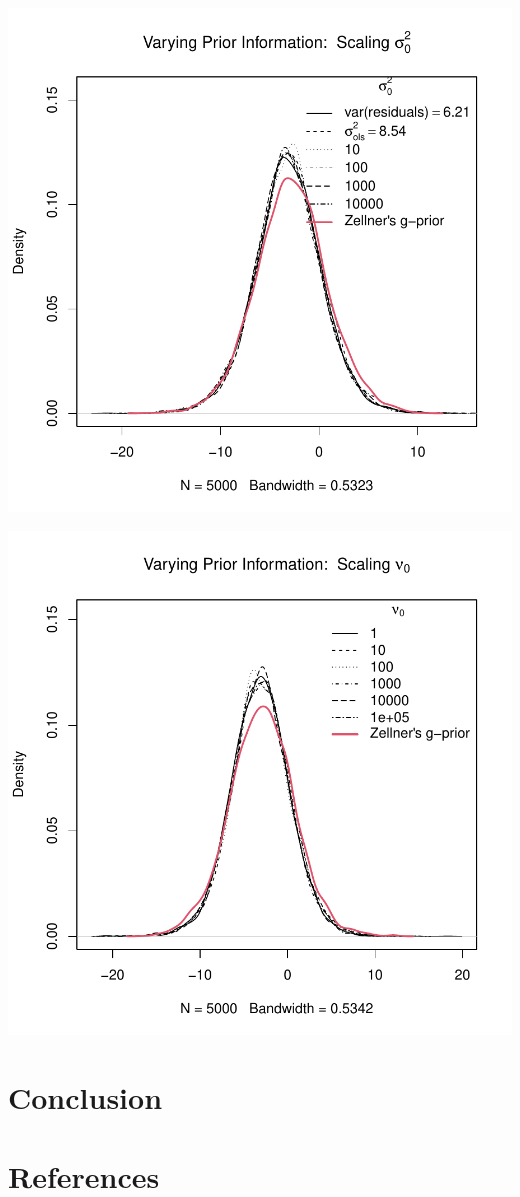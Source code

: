 \documentclass[12pt, a4paper]{article}
\begin{document}
\includegraphics{Thesis_v1-025}

\includegraphics{Thesis_v1-026}

\clearpage

\section{Conclusion}

\section{References}
\end{document}
